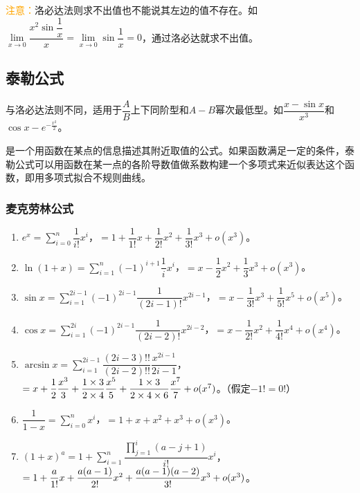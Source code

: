\documentclass[UTF8, 12pt]{ctexart}
\begin{document}
        \textcolor{orange}{注意：}洛必达法则求不出值也不能说其左边的值不存在。如$\lim\limits_{x\to0}\dfrac{x^2\sin\dfrac{1}{x}}{x}=\lim\limits_{x\to0}\sin\dfrac{1}{x}=0$，通过洛必达就求不出值。

        \subsection{泰勒公式}

        与洛必达法则不同，适用于$\dfrac{A}{B}$上下同阶型和$A-B$幂次最低型。如$\dfrac{x-\sin x}{x^3}$和$\cos x-e^{-\frac{x^2}{2}}$。

        是一个用函数在某点的信息描述其附近取值的公式。如果函数满足一定的条件，泰勒公式可以用函数在某一点的各阶导数值做系数构建一个多项式来近似表达这个函数，即用多项式拟合不规则曲线。

        \subsubsection{麦克劳林公式}

        \begin{enumerate}
            \item $e^x=\sum\limits_{i=0}^n\dfrac{1}{i!}x^i$，$=1+\dfrac{1}{1!}x+\dfrac{1}{2!}x^2+\dfrac{1}{3!}x^3+o(x^3)$。
            \item $\ln(1+x)=\sum\limits_{i=1}^n(-1)^{i+1}\dfrac{1}{i}x^i$，$=x-\dfrac{1}{2}x^2+\dfrac{1}{3}x^3+o(x^3)$。
            \item $\sin x=\sum\limits_{i=1}^{2i-1}(-1)^{2i-1}\dfrac{1}{(2i-1)!}x^{2i-1}$，$=x-\dfrac{1}{3!}x^3+\dfrac{1}{5!}x^5+o(x^5)$。
            \item $\cos x=\sum\limits_{i=1}^{2i}(-1)^{2i-1}\dfrac{1}{(2i-2)!}x^{2i-2}$，$=x-\dfrac{1}{2!}x^2+\dfrac{1}{4!}x^4+o(x^4)$。
            \item $\arcsin x=\sum\limits_{i=1}^{2i-1}\dfrac{(2i-3)!!}{(2i-2)!!}\dfrac{x^{2i-1}}{2i-1}$，$=x+\dfrac{1}{2}\dfrac{x^3}{3}+\dfrac{1\times3}{2\times4}\dfrac{x^5}{5}+\dfrac{1\times3\time5}{2\times4\times6}\dfrac{x^7}{7}+o(x^7)$。（假定$-1!=0!$）
            \item $\dfrac{1}{1-x}=\sum\limits_{i=0}^nx^i$，$=1+x+x^2+x^3+o(x^3)$。
            \item $(1+x)^a=1+\sum\limits_{i=1}^n\dfrac{\prod_{j=1}^i(a-j+1)}{i!}x^i$，$=1+\dfrac{a}{1!}x+\dfrac{a(a-1)}{2!}x^2\\+\dfrac{a(a-1)(a-2)}{3!}x^3+o(x^3)$。
        \end{enumerate}
\end{document}
